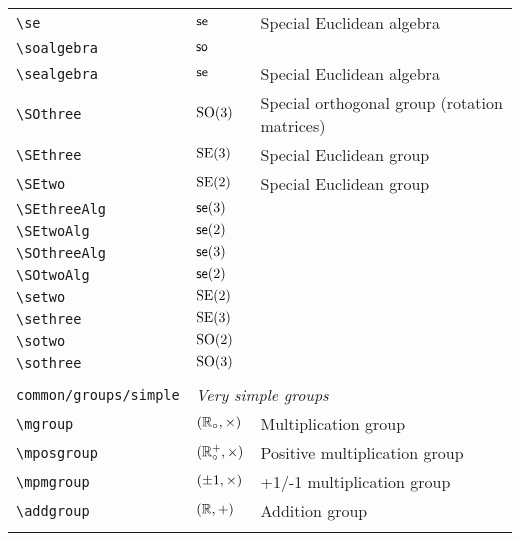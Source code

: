 \begin{longtable}{lll}
 {\color[rgb]{0.5,0.5,0.5}\texttt{\textbackslash se}} & $\mathsf{se}$ &  Special Euclidean algebra\\ 
 {\color[rgb]{0.5,0.5,0.5}\texttt{\textbackslash soalgebra}} & $\mathsf{so}$ & \\ 
 {\color[rgb]{0.5,0.5,0.5}\texttt{\textbackslash sealgebra}} & $\mathsf{se}$ &  Special Euclidean algebra\\ 
 {\color[rgb]{0.5,0.5,0.5}\texttt{\textbackslash SOthree}} & $\mathrm{SO(3)}$ &  Special orthogonal group (rotation matrices)\\ 
 {\color[rgb]{0.5,0.5,0.5}\texttt{\textbackslash SEthree}} & $\mathrm{SE(3)}$ &  Special Euclidean group \\ 
 {\color[rgb]{0.5,0.5,0.5}\texttt{\textbackslash SEtwo}} & $\mathrm{SE(2)}$ &  Special Euclidean group \\ 
 {\color[rgb]{0.5,0.5,0.5}\texttt{\textbackslash SEthreeAlg}} & $\mathsf{se}(3)$ & \\ 
 {\color[rgb]{0.5,0.5,0.5}\texttt{\textbackslash SEtwoAlg}} & $\mathsf{se}(2)$ & \\ 
 {\color[rgb]{0.5,0.5,0.5}\texttt{\textbackslash SOthreeAlg}} & $\mathsf{se}(3)$ & \\ 
 {\color[rgb]{0.5,0.5,0.5}\texttt{\textbackslash SOtwoAlg}} & $\mathsf{se}(2)$ & \\ 
 {\color[rgb]{0.5,0.5,0.5}\texttt{\textbackslash setwo}} & $\mathrm{SE(2)}$ & \\ 
 {\color[rgb]{0.5,0.5,0.5}\texttt{\textbackslash sethree}} & $\mathrm{SE(3)}$ & \\ 
 {\color[rgb]{0.5,0.5,0.5}\texttt{\textbackslash sotwo}} & $\mathrm{SO}(2)$ & \\ 
 {\color[rgb]{0.5,0.5,0.5}\texttt{\textbackslash sothree}} & $\mathrm{SO(3)}$ & \\ 
  &  & \\ 
 {\color[rgb]{0.5,0.5,0.5}\texttt{common/groups/simple}} & \multicolumn{2}{l}{\emph{Very simple groups}}\\ 
 \hline
{\color[rgb]{0.5,0.5,0.5}\texttt{\textbackslash mgroup}} & $(\mathbb{R}_{\circ},\times)$ &  Multiplication group\\ 
 {\color[rgb]{0.5,0.5,0.5}\texttt{\textbackslash mposgroup}} & $(\mathbb{R}^{+}_{\circ},\times)$ &  Positive multiplication group\\ 
 {\color[rgb]{0.5,0.5,0.5}\texttt{\textbackslash mpmgroup}} & $(\pm1,\times)$ &  +1/-1 multiplication group\\ 
 {\color[rgb]{0.5,0.5,0.5}\texttt{\textbackslash addgroup}} & $(\mathbb{R},+)$ &  Addition group\\ 
  &  & \\ 

\end{longtable}
